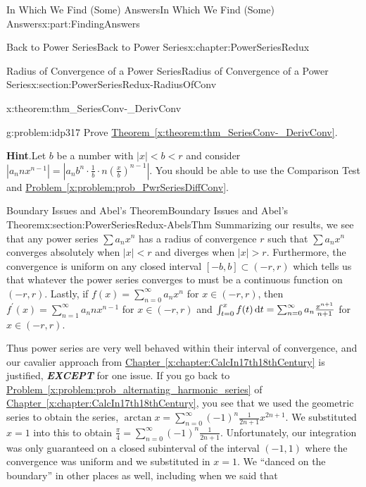 \documentclass[oneside,10pt,]{book}
\newcommand{\blocktitlefont}{\relax}
\newcommand{\xreffont}{\relax}
\newcommand{\alert}[1]{\textbf{\textit{#1}}}
\numberwithin{equation}{section}
\newcommand{\dx}[1]{\,{\rm d}#1}
\newcommand{\abs}[1]{\left|#1\right|}
\newcommand{\lt}{<}
\begin{document}
\begin{partptx}{In Which We Find (Some) Answers}{}{In Which We Find (Some) Answers}{}{}{x:part:FindingAnswers}
\begin{chapterptx}{Back to Power Series}{}{Back to Power Series}{}{}{x:chapter:PowerSeriesRedux}
\begin{sectionptx}{Radius of Convergence of a Power Series}{}{Radius of Convergence of a Power Series}{}{}{x:section:PowerSeriesRedux-RadiusOfConv}
\begin{theorem}{}{}{x:theorem:thm_SeriesConv-_DerivConv}
\end{theorem}
\begin{problem}{}{g:problem:idp317}%
Prove \hyperref[x:theorem:thm_SeriesConv-_DerivConv]{Theorem~{\xreffont\ref{x:theorem:thm_SeriesConv-_DerivConv}}}.%
\par\smallskip%
\noindent\textbf{\blocktitlefont Hint}.\hypertarget{g:hint:idp318}{}\quad{}Let \(b\) be a number with \(\abs{x}\lt b\lt r\) and consider \(\abs{a_nnx^{n-1}} =\abs{a_nb^n\cdot\frac{1}{b}\cdot
n\left(\frac{x}{b}\right)^{n-1}}\).  You should be able to use the Comparison Test and \hyperref[x:problem:prob_PwrSeriesDiffConv]{Problem~{\xreffont\ref{x:problem:prob_PwrSeriesDiffConv}}}.%
\end{problem}
\end{sectionptx}
%
%
\typeout{************************************************}
\typeout{************************************************}
%
\begin{sectionptx}{Boundary Issues and Abel's Theorem}{}{Boundary Issues and Abel's Theorem}{}{}{x:section:PowerSeriesRedux-AbelsThm}
Summarizing our results, we see that any power series \(\sum a_nx^n\) has a radius of convergence \(r\) such that \(\sum a_nx^n\) converges absolutely when \(|x|\lt r\) and diverges when \(|x|>r\). Furthermore, the convergence is uniform on any closed interval \([-b,b]\subset(-r,r)\) which tells us that whatever the power series converges to must be a continuous function on \((-r,r)\). Lastly, if \(f(x)=\sum_{n=0}^\infty a_nx^n\) for \(x\in(-r,r)\), then \(f^\prime(x)=\sum_{n=1}^\infty a_nnx^{n-1}\) for \(x\in(-r,r)\) and \(\int_{t=0}^xf(t)\dx{ t} = \sum_{n=0}^\infty a_n\frac{x^{n+1}}{n+1}\) for \(x\in(-r,r)\).%
\par
Thus power series are very well behaved within their interval of convergence, and our cavalier approach from \hyperref[x:chapter:CalcIn17th18thCentury]{Chapter~{\xreffont\ref{x:chapter:CalcIn17th18thCentury}}} is justified, \alert{EXCEPT} for one issue. If you go back to \hyperref[x:problem:prob_alternating_harmonic_series]{Problem~{\xreffont\ref{x:problem:prob_alternating_harmonic_series}}} of \hyperref[x:chapter:CalcIn17th18thCentury]{Chapter~{\xreffont\ref{x:chapter:CalcIn17th18thCentury}}}, you see that we used the geometric series to obtain the series, \(\arctan x =\sum_{n=0}^\infty(-1)^n\frac{1}{2n+1}x^{2n+1}\). We substituted \(x=1\) into this to obtain \(\frac{\pi}{4}=\sum_{n=0}^\infty(-1)^n\frac{1}{2n+1}\). Unfortunately, our integration was only guaranteed on a closed subinterval of the interval \((-1,1)\) where the convergence was uniform and we substituted in \(x=1\). We ``danced on the boundary'' in other places as well, including when we said that%

\end{sectionptx}
\end{chapterptx}
\end{partptx}
\end{document}
